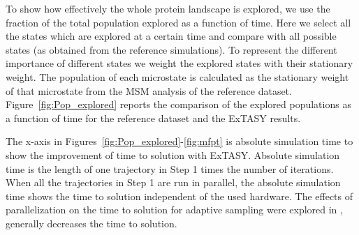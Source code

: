 To show how effectively the whole protein landscape is explored, we
use the fraction of the total population explored as a function of time.
Here we select all the states which are explored at a certain time and
compare with all possible states (as obtained from the reference simulations).
To represent the different importance of different states we weight the
explored states with their stationary weight. The population of each microstate
is calculated as the stationary weight of that microstate from the MSM analysis of
the reference dataset. Figure~\ref{fig:Pop_explored} reports the comparison of
the explored populations as a function of time for the reference dataset and
the ExTASY results. 

The x-axis in Figures~\ref{fig:Pop_explored}-\ref{fig:mfpt}
is absolute simulation time to show the improvement of time to solution with ExTASY.
Absolute simulation time is the length of one trajectory in Step 1 times the number of iterations.
When all the trajectories in Step 1 are run in parallel, the absolute simulation time
shows the time to solution independent of the used hardware. The effects of parallelization
on the time to solution for adaptive sampling were explored in \cite{Adstrategies2018},
generally  decreases the time to solution.

